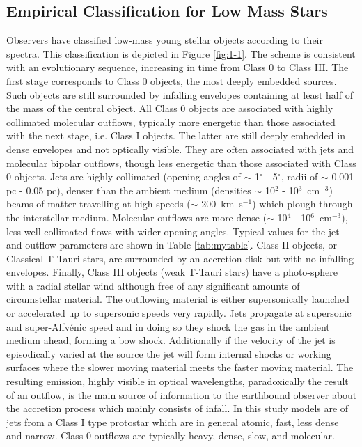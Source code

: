 \subsection{Empirical Classification for Low Mass Stars}
Observers have classified low-mass young stellar objects according to their spectra.
This classification
\citep{1987IAUS..115....1L,1993ApJ...406..122A} is depicted in Figure \ref{fig:1-1}.
The scheme is consistent with an evolutionary sequence, increasing in time from Class 0 to Class III.
The first stage corresponds to Class 0 objects, the most deeply embedded sources. 
Such objects are still surrounded by infalling envelopes containing at least half of the mass of the central object. 
All Class 0 objects are associated with highly collimated molecular outflows, typically more
energetic than those associated with the next stage, i.e. Class I objects. 
The latter are still deeply embedded in dense envelopes and not optically visible. 
They are often associated with jets and molecular bipolar outflows, though less energetic than those associated with Class 0 objects.
Jets are highly collimated (opening angles of $\sim$ 1$^{\circ}$ - 5$^{\circ}$,
radii of $\sim$ 0.001 pc - 0.05 pc), denser than the ambient medium (densities $\sim$ 10$^2$ - 10$^3$~cm$^{-3}$) beams of matter travelling at high speeds ($\sim$ 200~km~s$^{-1}$) which plough through the interstellar medium. 
Molecular outflows are more dense ($\sim$ 10$^4$ - 10$^6$~cm$^{-3}$), less well-collimated flows with wider opening angles. 
Typical values for the jet and outflow parameters are shown in Table \ref{tab:mytable}.
Class II objects, or Classical T-Tauri stars, are surrounded by an accretion disk but with no infalling envelopes. 
Finally, Class III objects (weak T-Tauri stars) have a photo-sphere with a
radial stellar wind although free of any significant amounts of circumstellar material.
The outflowing material is either supersonically launched or accelerated up to supersonic speeds very rapidly.
Jets propagate at supersonic and super-Alfv\'enic speed and in doing so they shock the gas in the
ambient medium ahead, forming a bow shock. 
Additionally if the velocity of the jet is episodically varied at the source the jet will form
internal shocks or working surfaces where the slower moving material meets the faster moving
material.
The resulting emission, highly visible in optical wavelengths, paradoxically the result of an outflow, is the main source of information to the earthbound observer about the accretion process which mainly consists of infall.
In this study models are of jets from a Class I type protostar which are in general atomic, fast, less dense and narrow. Class 0 outflows are typically heavy, dense, slow, and molecular.


